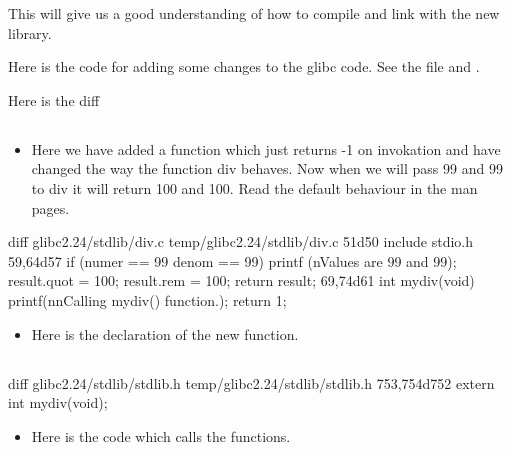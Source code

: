 \documentclass[letterpaper,10pt,english]{sphinxmanual}
\begin{document}
This will give us a good understanding of how to compile and link with the new
library.

Here is the code for adding some changes to the glibc code. See the file
 and .

Here is the diff


\subsection{}
\label{\detokenize{03_glibc:glibc-2-24-stdlib-div-c}}\begin{itemize}
\item {} 
Here we have added a function  which just returns -1 on invokation
and have changed the way the function div behaves. Now when we will pass 99 and
99 to div it will return 100 and 100. Read the default behaviour in the man
pages.

\end{itemize}

\begin{sphinxVerbatim}[commandchars=\\\{\}]
\PYGZdl{} diff glibc\PYGZhy{}2.24/stdlib/div.c temp/glibc\PYGZhy{}2.24/stdlib/div.c
51d50
\PYGZlt{} \PYGZsh{}include \PYGZlt{}stdio.h\PYGZgt{}
59,64d57
\PYGZlt{}   if (numer == 99 \PYGZam{}\PYGZam{} denom == 99) \PYGZob{}
\PYGZlt{}   printf (\PYGZdq{}\PYGZbs{}nValues are 99 and 99\PYGZdq{});
\PYGZlt{}   result.quot = 100;
\PYGZlt{}   result.rem = 100;
\PYGZlt{}   return result;
\PYGZlt{}   \PYGZcb{}
69,74d61
\PYGZlt{} \PYGZcb{}
\PYGZlt{}
\PYGZlt{}
\PYGZlt{} int my\PYGZus{}div(void) \PYGZob{}
\PYGZlt{}   printf(\PYGZdq{}\PYGZbs{}n\PYGZbs{}nCalling my\PYGZus{}div() function.\PYGZdq{});
\PYGZlt{}   return \PYGZhy{}1;
\end{sphinxVerbatim}
\begin{itemize}
\item {} 
Here is the declaration of the new function.

\end{itemize}


\subsection{}
\label{\detokenize{03_glibc:glibc-2-24-stdlib-stdlib-h}}
\begin{sphinxVerbatim}[commandchars=\\\{\}]
\PYGZdl{} diff glibc\PYGZhy{}2.24/stdlib/stdlib.h temp/glibc\PYGZhy{}2.24/stdlib/stdlib.h
753,754d752
\PYGZlt{}
\PYGZlt{} extern int my\PYGZus{}div(void);
\end{sphinxVerbatim}
\begin{itemize}
\item {} 
Here is the code which calls the functions.

\end{itemize}
\end{document}
